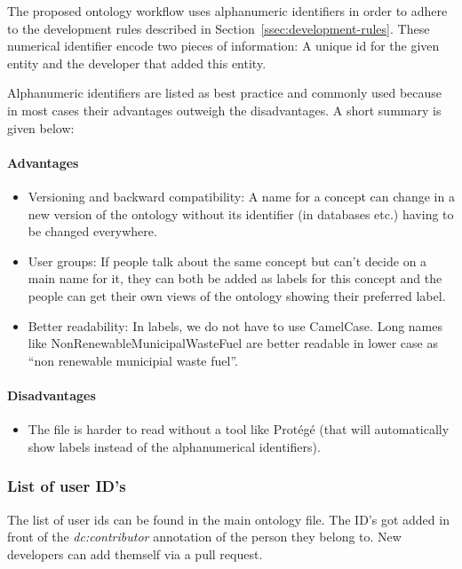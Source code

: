 The proposed ontology workflow uses alphanumeric identifiers in order to adhere to the development rules described in Section~\ref{ssec:development-rules}. These numerical identifier encode two pieces of information: A unique id for the given entity and the developer that added this entity.

Alphanumeric identifiers are listed as best
practice and commonly used because in most cases their advantages
outweigh the disadvantages. A short summary is given below:
\paragraph{Advantages} 
\begin{itemize}
    \item Versioning and backward compatibility: A name for a concept
    can change in a new version of the ontology without its identifier (in
    databases etc.) having to be changed everywhere. 
    \item User groups: If people
    talk about the same concept but can't decide on a main name for it, they
    can both be added as labels for this concept and the people can get
    their own views of the ontology showing their preferred label. 
    \item Better readability: In labels, we do not have to use CamelCase. Long names like NonRenewableMunicipalWasteFuel are better readable in lower case as ``non renewable municipial waste fuel''.
\end{itemize}


\hypertarget{disadvantages}{%
\paragraph{Disadvantages}\label{disadvantages}}

\begin{itemize}
\item
  The file is harder to read without a tool like Prot\'eg\'e (that will
  automatically show labels instead of the alphanumerical identifiers).
\end{itemize}


\subsubsection{List of user ID's}
\label{ssec:list-of-user-ids}

The list of user ids can be found in the main ontology file. The ID's got added in front of the \emph{dc:contributor}
annotation of the person they belong to. New developers can add themself via a pull request.


